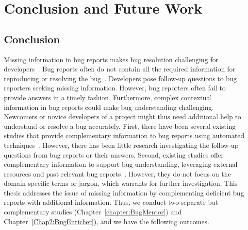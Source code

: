 \chapter{Conclusion and Future Work}

\section{Conclusion}
Missing information in bug reports makes bug resolution challenging for developers~\cite{zou2018practitioners}. Bug reports often do not contain all the required information for reproducing or resolving the bug~\cite{zhang2017bug}. Developers pose follow-up questions to bug reporters seeking missing information. However, bug reporters often fail to provide answers in a timely fashion. Furthermore, complex contextual information in bug reports could make bug understanding challenging. Newcomers or novice developers of a project might thus need additional help to understand or resolve a bug accurately. First, there have been several existing studies that provide complementary information to bug reports using automated techniques~\cite{imran2021automatically, tian2017apibot,bansal2021neural, lu2021beat,breu2010information}. However, there has been little research investigating the follow-up questions from bug reports or their answers. Second, existing studies offer complementary information to support bug understanding, leveraging external resources and past relevant bug reports~\cite{correa2013samekana,zhang2017bug,dit2008improving,moran2018enhancing,fazzini2022enhancing,xu2017answerbot}. However, they do not focus on the domain-specific terms or jargon, which warrants for further investigation. This thesis addresses the issue of missing information by complementing deficient bug reports with additional information. Thus, we conduct two separate but complementary studies (Chapter~\ref{chapter:BugMentor}) and Chapter~\ref{Chap2:BugEnricher}), and we have the following outcomes. \par

